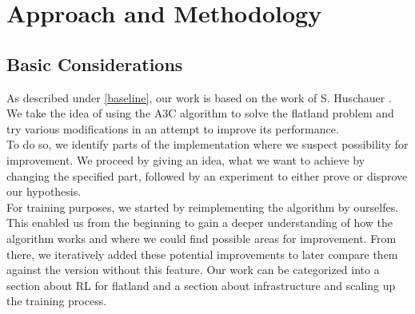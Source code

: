 
%
%

\chapter{Approach and Methodology}\label{chap.vorgehen}
\section{Basic Considerations}\label{basic_cons}
As described under \autoref{baseline}, our work is based on the work of S. Huschauer \cite{flatlandstephan}. We take the idea of using the A3C algorithm to solve the flatland problem and try various modifications in an attempt to improve its performance.\\
To do so, we identify parts of the implementation where we suspect possibility for improvement. We proceed by giving an idea, what we want to achieve by changing the specified part, followed by an experiment to either prove or disprove our hypothesis.\\
For training purposes, we started by reimplementing the algorithm by ourselfes. This enabled us from the beginning to gain a deeper understanding of how the algorithm works and where we could find possible areas for improvement. From there, we iteratively added these potential improvements to later compare them against the version without this feature.
Our work can be categorized into a section about RL for flatland and a section about infrastructure and scaling up the training process.
